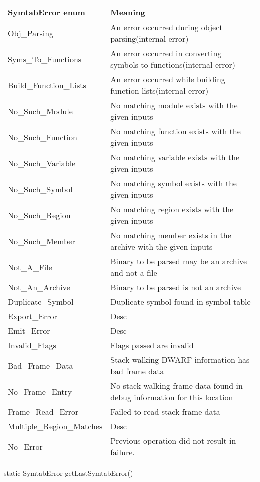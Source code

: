 \begin{center}
    \begin{tabular}{ll}
        \toprule
        SymtabError enum& Meaning\\
        \midrule
     Obj\_Parsing & An error occurred during object parsing(internal error)\\
     Syms\_To\_Functions & An error occurred in converting symbols to functions(internal error)\\
     Build\_Function\_Lists & An error occurred while building function lists(internal error)\\
     No\_Such\_Module & No matching module exists with the given inputs\\
     No\_Such\_Function & No matching function exists with the given inputs\\
     No\_Such\_Variable & No matching variable exists with the given inputs\\
     No\_Such\_Symbol & No matching symbol exists with the given inputs\\
     No\_Such\_Region & No matching region exists with the given inputs\\
     No\_Such\_Member & No matching member exists in the archive with the given inputs\\
     Not\_A\_File & Binary to be parsed may be an archive and not a file\\
     Not\_An\_Archive & Binary to be parsed is not an archive\\
     Duplicate\_Symbol & Duplicate symbol found in symbol table\\
     Export\_Error & Desc \\
     Emit\_Error & Desc \\
     Invalid\_Flags & Flags passed are invalid\\
     Bad\_Frame\_Data & Stack walking DWARF information has bad frame data\\
     No\_Frame\_Entry & No stack walking frame data found in debug information for this location\\
     Frame\_Read\_Error & Failed to read stack frame data\\
     Multiple\_Region\_Matches & Desc \\ 
     No\_Error & Previous operation did not result in failure.\\
     \bottomrule
 \end{tabular}
 \end{center}

\begin{apient}
static SymtabError getLastSymtabError()
\end{apient}

